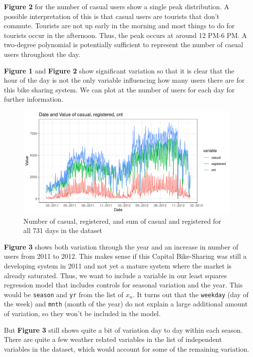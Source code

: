 \documentclass[
]{article}
\begin{document}
\textbf{Figure 2} for the number of casual users show a single peak
distribution. A possible interpretation of this is that casual users are
tourists that don't commute. Tourists are not up early in the morning
and most things to do for tourists occur in the afternoon. Thus, the
peak occurs at around 12 PM-6 PM. A two-degree polynomial is potentially
sufficient to represent the number of casual users throughout the day.

\textbf{Figure 1} and \textbf{Figure 2} show significant variation so
that it is clear that the hour of the day is not the only variable
influencing how many users there are for this bike sharing system. We
can plot at the number of users for each day for further information.

\begin{figure}
\centering
\includegraphics{LeastSquares_files/figure-latex/unnamed-chunk-3-1.pdf}
\caption{Number of casual, registered, and sum of casual and registered
for all 731 days in the dataset}
\end{figure}

\textbf{Figure 3} shows both variation through the year and an increase
in number of users from 2011 to 2012. This makes sense if this Capital
Bike-Sharing was still a developing system in 2011 and not yet a mature
system where the market is already saturated. Thus, we want to include a
variable in our least squares regression model that includes controls
for seasonal variation and the year. This would be \texttt{season} and
\texttt{yr} from the list of \(x_{n}\). It turns out that the
\texttt{weekday} (day of the week) and \texttt{mnth} (month of the year)
do not explain a large additional amount of variation, so they won't be
included in the model.

But \textbf{Figure 3} still shows quite a bit of variation day to day
within each season. There are quite a few weather related variables in
the list of independent variables in the dataset, which would account
for some of the remaining variation.
\end{document}
